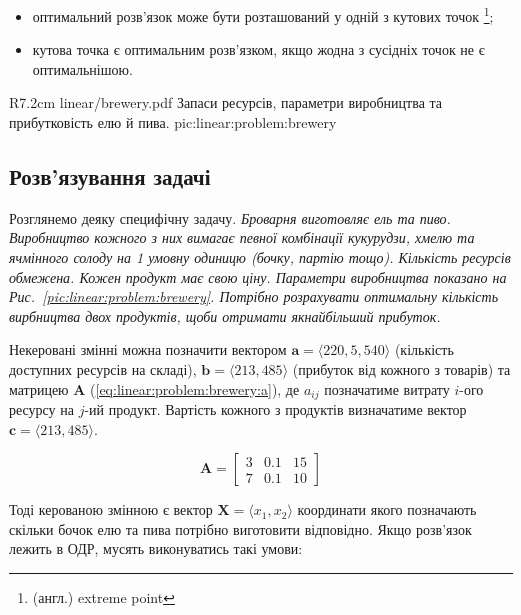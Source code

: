 \documentclass[\main/book.tex]{subfiles}
\begin{document}
\begin{conclusions}
\begin{itemize}
 \item оптимальний розв'язок може бути розташований у одній з кутових точок \footnote{(англ.) extreme point};
 \item кутова точка є оптимальним розв'язком, якщо жодна з сусідніх точок не є оптимальнішою.
\end{itemize}
\label{conclusion:linear:optimal_solution}
\end{conclusions}

\asidepic
 {R}{7.2cm}
 {linear/brewery.pdf}
 {Запаси ресурсів, параметри ви\-роб\-ниц\-тва та прибутковість елю й пива.}
 {pic:linear:problem:brewery}

\subsection{Розв'язування задачі}

Розглянемо деяку специфічну задачу. \textit{Броварня виготовляє ель та пиво. Виробництво кожного з них вимагає певної комбінації кукурудзи, хмелю та ячмінного солоду на 1 умовну одиницю (бочку, партію тощо). Кількість ресурсів обмежена. Кожен продукт має свою ціну. Параметри виробництва показано на Рис.~\ref{pic:linear:problem:brewery}. Потрібно розрахувати оптимальну кількість вирбництва двох продуктів, щоби отримати якнайбільший прибуток.}

Некеровані змінні можна позначити вектором $\mathbf{a} = {\langle 220, 5, 540 \rangle}$ (кількість доступних ресурсів на складі), $\mathbf{b} = {\langle 213, 485 \rangle}$ (прибуток від кожного з товарів) та матрицею $\mathbf{A}$ (\ref{eq:linear:problem:brewery:a}), де $a_{ij}$ позначатиме витрату $i$-ого ресурсу на $j$-ий продукт. Вартість кожного з продуктів визначатиме вектор $\mathbf{c} = {\langle 213, 485 \rangle}$.

\begin{equation}
 \mathbf{A} = \begin{bmatrix}
               3 & 0.1 & 15 \\
               7 & 0.1 & 10
              \end{bmatrix}
 \label{eq:linear:problem:brewery:a}
\end{equation}

Тоді керованою змінною є вектор $\mathbf{X} = \langle x_1, x_2 \rangle$ координати якого позначають скільки бочок елю та пива потрібно виготовити відповідно. Якщо розв'язок лежить в ОДР, мусять виконуватись такі умови:
\end{document}
